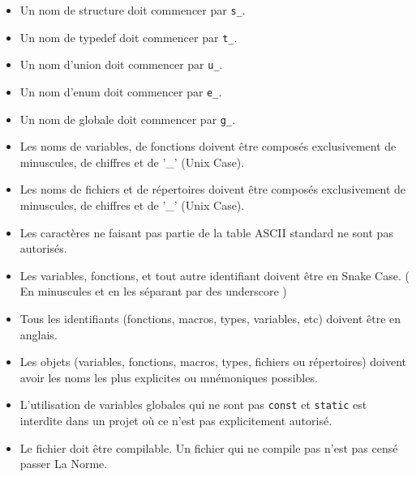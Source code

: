 \documentclass{42-fr}
\begin{document}
        \begin{itemize}

            \item Un nom de structure doit commencer par
                \texttt{s\_}.

            \item Un nom de typedef doit commencer par
                \texttt{t\_}.

            \item Un nom d’union doit commencer par \texttt{u\_}.

            \item Un nom d’enum doit commencer par \texttt{e\_}.

            \item Un nom de globale doit commencer par \texttt{g\_}.

            \item Les noms de variables, de fonctions doivent être composés exclusivement de 
                minuscules, de chiffres et de '\_' (Unix Case).

            \item Les noms de fichiers et de répertoires doivent être composés exclusivement de
                minuscules, de chiffres et de '\_' (Unix Case).

            \item Les caractères ne faisant pas partie de la table ASCII standard 
                ne sont pas autorisés.

            \item Les variables, fonctions, et tout autre identifiant doivent être en Snake Case.
                ( En minuscules et en les séparant par des underscore )

            \item Tous les identifiants (fonctions, macros, types, variables, etc) 
                doivent être en anglais.

            \item Les objets (variables, fonctions, macros, types, fichiers ou répertoires) 
                doivent avoir les noms les plus explicites ou mnémoniques possibles.
            
            \item L'utilisation de variables globales qui ne sont pas \texttt{const} et \texttt{static} est interdite 
                dans un projet où ce n’est pas explicitement autorisé.

            \item Le fichier doit être compilable. Un fichier qui ne compile pas n'est 
                pas censé passer La Norme.
        \end{itemize}
\newpage
\end{document}

